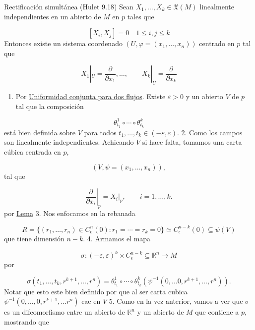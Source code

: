 \begin{bookproposition}{Rectificación simultánea (Hulet 9.18)}
Sean $X_1,\ldots,X_k\in\mathfrak X(M)$ linealmente independientes en un abierto de $M$ en $p$ tales que

\[
[X_{i},X_{j}]=0\quad 1\leq i,j\leq k
\]
Entonces existe un sistema coordenado $(U,\varphi=(x_1,\ldots,x_n))$ centrado en $p$ tal que

\[
X_1|_U=\frac{\partial}{\partial x_1},\ldots,\qquad X_k|_U=\frac{\partial}{\partial x_k}
\]
\end{bookproposition}
\begin{bookproof}{}
\begin{enumerate}
\item Por \hyperref[blk:39cc9a]{Uniformidad conjunta para dos flujos}. Existe $\varepsilon>0$ y un abierto $V$ de $p$ tal que la composición
\end{enumerate}
\[
\theta^{1}_{t_1}\circ\cdots\circ\theta^k_{t_k}
\]
está bien definida sobre $V$ para todos $t_1,\ldots,t_k\in(-\varepsilon,\varepsilon)$. 2. Como los campos son linealmente independientes. Achicando $V$ si hace falta, tomamos una carta cúbica centrada en $p$,

\[
(V,\psi=(x_1,\ldots,x_n)),
\]
tal que

\[
\left.\frac{\partial}{\partial x_i}\right|_p=X_i|_p,\qquad i=1,\ldots,k.
\]
por \hyperref[blk:047506]{Lema} 3. Nos enfocamos en la rebanada

\[
R=\{(r_1,\ldots,r_n)\in C_{\epsilon}^{n} (0):r_1=\cdots=r_k=0\}\simeq C_{\epsilon}^{n-k} (0)\subseteq \psi(V)
\]
que tiene dimensión $n-k$. 4. Armamos el mapa

\[
\sigma:(-\varepsilon,\varepsilon)^k\times C_{\epsilon}^{n-k}\subseteq \mathbb{R}^{n}  \to M
\]
por

\[
\sigma(t_1,\ldots,t_k,r^{k+1},\ldots,r^{n}  )=\theta^1_{t_1}\circ\cdots\circ\theta^k_{t_k}(\psi^{-1}(0,\ldots 0,r^{k+1},\ldots,r^{n}  )).
\]
Notar que esto este bien definido por que al ser carta cubica $\psi ^{-1}(0,\ldots,0,r^{k+1},\ldots r^{n})$ cae en $V$ 5. Como en la vez anterior, vamos a ver que $\sigma$ es un difeomorfismo entre un abierto de $\mathbb{R}^n$ y un abierto de $M$ que contiene a $p$, mostrando que


\end{bookproof}
